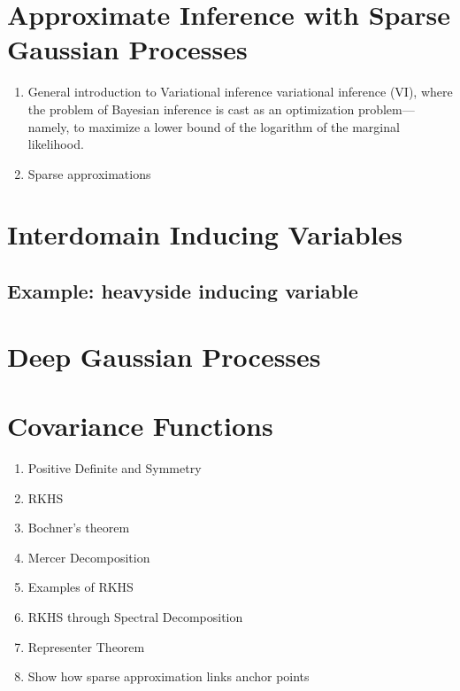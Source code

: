 \section{Approximate Inference with Sparse Gaussian Processes}

\begin{enumerate}
  \item General introduction to Variational inference \citep{blei2017variational}
variational inference (VI), where the problem of Bayesian inference is cast as an optimization problem—namely, to maximize a lower bound of the logarithm of the marginal likelihood.
  \item Sparse approximations \citep{Snelson05,quinonero2005unifying}
\end{enumerate}

\section{Interdomain Inducing Variables}

\subsection{Example: heavyside inducing variable}


\section{Deep Gaussian Processes}



\section{Covariance Functions}

\begin{enumerate}
  \item Positive Definite and Symmetry
  \item RKHS
  \item Bochner's theorem
  \item Mercer Decomposition
  \item Examples of RKHS
  \item RKHS through Spectral Decomposition
  \item Representer Theorem
  \item Show how sparse approximation links anchor points
\end{enumerate}
